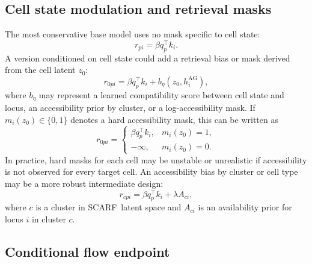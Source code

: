 \documentclass{article}
\newcommand{\scarf}{\textsc{SCARF}}
\begin{document}
\subsection{Cell state modulation and retrieval masks}

The most conservative base model uses no mask specific to cell state:
\begin{equation}
    r_{pi} = \beta q_p^\top k_i.
\end{equation}
A version conditioned on cell state could add a retrieval bias or mask derived from the cell latent \(z_0\):
\begin{equation}
    r_{0pi} = \beta q_p^\top k_i + b_\eta(z_0, h_i^{\mathrm{AG}}),
\end{equation}
where \(b_\eta\) may represent a learned compatibility score between cell state and locus, an accessibility prior by cluster, or a log-accessibility mask. If \(m_i(z_0) \in \{0,1\}\) denotes a hard accessibility mask, this can be written as
\begin{equation}
    r_{0pi} =
    \begin{cases}
        \beta q_p^\top k_i, & m_i(z_0)=1,\\
        -\infty, & m_i(z_0)=0.
    \end{cases}
\end{equation}
In practice, hard masks for each cell may be unstable or unrealistic if accessibility is not observed for every target cell. An accessibility bias by cluster or cell type may be a more robust intermediate design:
\begin{equation}
    r_{cpi} = \beta q_p^\top k_i + \lambda A_{ci},
\end{equation}
where \(c\) is a cluster in \scarf\ latent space and \(A_{ci}\) is an availability prior for locus \(i\) in cluster \(c\).

\subsection{Conditional flow endpoint}
\end{document}
